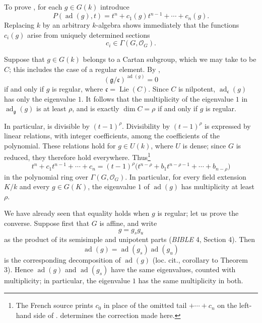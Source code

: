 To prove , for each \(g\in G(k)\) introduce 
\[
  P(\operatorname{ad}(g),t)
  =t^n+c_1(g)t^{n-1}+\cdots+c_n(g).
\]
Replacing \(k\) by an arbitrary \(k\)-algebra shows immediately that
the functions \(c_i(g)\) arise from uniquely determined sections
\[
  c_i\in\Gamma(G,\mathcal O_G).
\]

Suppose that \(g\in G(k)\) belongs to a Cartan subgroup, which we may
take to be \(C\); this includes the case of a regular element. By
,
\[
  (\mathfrak g/\mathfrak c)^{\operatorname{ad}(g)}=0
\]
if and only if \(g\) is regular, where
\(\mathfrak c=\operatorname{Lie}(C)\). Since \(C\) is nilpotent,
\(\operatorname{ad}_{\mathfrak c}(g)\) has only the eigenvalue \(1\).
It follows that the multiplicity of the eigenvalue \(1\) in
\(\operatorname{ad}_{\mathfrak g}(g)\) is at least \(\rho\), and is
exactly \(\dim C=\rho\) if and only if \(g\) is regular.

In particular,  is divisible by
\((t-1)^\rho\). Divisibility by \((t-1)^\rho\) is expressed by
linear relations, with integer coefficients, among the coefficients
of the polynomial. These relations hold for \(g\in U(k)\), where
\(U\) is dense; since \(G\) is reduced, they therefore hold
everywhere. Thus\footnote{The French source prints \(c_0\) in place
of the omitted tail \(+\cdots+c_n\) on the left-hand side of
.  determines the correction made here.}
\[
\tag{\(\dagger\)}
  t^n+c_1t^{n-1}+\cdots+c_n
  =(t-1)^\rho
    \bigl(t^{n-\rho}+b_1t^{n-\rho-1}+\cdots+b_{n-\rho}\bigr)
\]
in the polynomial ring over \(\Gamma(G,\mathcal O_G)\). In
particular, for every field extension \(K/k\) and every
\(g\in G(K)\), the eigenvalue \(1\) of \(\operatorname{ad}(g)\) has
multiplicity at least \(\rho\).

We have already seen that equality holds when \(g\) is regular; let
us prove the converse. Suppose first that \(G\) is affine, and write
\[
  g=g_sg_u
\]
as the product of its semisimple and unipotent parts
(\emph{BIBLE} 4, Section 4). Then
\[
  \operatorname{ad}(g)
  =\operatorname{ad}(g_s)\operatorname{ad}(g_u)
\]
is the corresponding decomposition of \(\operatorname{ad}(g)\)
(loc. cit., corollary to Theorem 3). Hence
\(\operatorname{ad}(g)\) and \(\operatorname{ad}(g_s)\) have the same
eigenvalues, counted with multiplicity; in particular, the
eigenvalue \(1\) has the same multiplicity in both.


